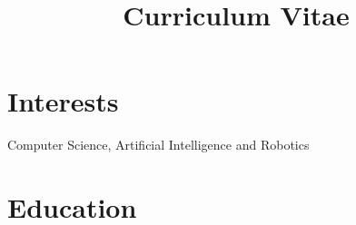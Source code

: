 \documentclass[11pt,a4paper,sans]{moderncv} %
\title{Curriculum Vitae}
\begin{document}









\makecvtitle %



 \section{Interests}
 Computer Science,
 Artificial Intelligence
 and 
 Robotics
 


\section{Education}
\end{document}
